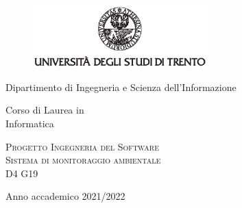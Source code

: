 \pagestyle{plain}
\thispagestyle{empty}

\graphicspath{{assets/figures/}}

\begin{center}
	\begin{figure}[h!]
		\centerline{\includegraphics[width=0.6\textwidth]{Img/logo_unitn_black_center.eps}}
	\end{figure}

	\vspace{2 cm}

	\LARGE{Dipartimento di Ingegneria e Scienza dell’Informazione}

	\vspace{1 cm}

	\Large{
		Corso di Laurea in\\
		Informatica
	}

	\vspace{2 cm}
	\Large\textsc{Progetto Ingegneria del Software\\}
	\vspace{1 cm}
	\Huge\textsc{Sistema di monitoraggio ambientale\\}
	\vspace{1cm}
	\Large{D4 G19}

	\vspace{4cm}

	\Large{Anno accademico 2021/2022}
\end{center}
